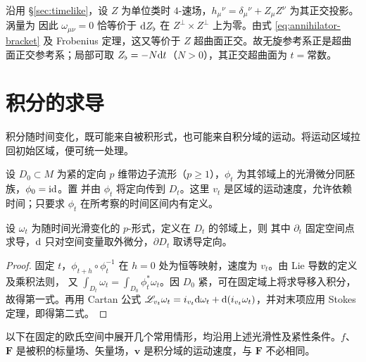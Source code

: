 \begin{example}[无旋参考系]
    沿用 \S\ref{sec:timelike}，设 $Z$ 为单位类时 $4$-速场，$h_\mu{}^\nu=\delta_\mu{}^\nu+Z_\mu Z^\nu$ 为其正交投影。涡量为
    因此 $\omega_{\mu\nu}=0$ 恰等价于 $\dd Z_\flat$ 在 $Z^\perp\times Z^\perp$ 上为零。由式 \eqref{eq:annihilator-bracket} 及 Frobenius 定理，这又等价于 $Z$ 超曲面正交。故无旋参考系正是超曲面正交参考系；局部可取 $Z_\flat=-N\dd t$（$N>0$），其正交超曲面为 $t=\text{常数}$。
\end{example}

\section{积分的求导}

积分随时间变化，既可能来自被积形式，也可能来自积分域的运动。将运动区域拉回初始区域，便可统一处理。

设 $D_0\subset M$ 为紧的定向 $p$ 维带边子流形（$p\geqslant1$），$\phi_t$ 为其邻域上的光滑微分同胚族，$\phi_0=\mathrm{id}$。置
并由 $\phi_t$ 将定向传到 $D_t$。这里 $v_t$ 是区域的运动速度，允许依赖时间；只要求 $\phi_t$ 在所考察的时间区间内有定义。

\begin{theorem}[广义 Leibniz 公式]
    设 $\omega_t$ 为随时间光滑变化的 $p$-形式，定义在 $D_t$ 的邻域上，则
    其中 $\partial_t$ 固定空间点求导，$\dd$ 只对空间变量取外微分，$\partial D_t$ 取诱导定向。
\end{theorem}
\begin{proof}
    固定 $t$，$\phi_{t+h}\circ\phi_t^{-1}$ 在 $h=0$ 处为恒等映射，速度为 $v_t$。由 Lie 导数的定义及乘积法则，
    又 $\int_{D_t}\omega_t=\int_{D_0}\phi_t^*\omega_t$。因 $D_0$ 紧，可在固定域上将求导移入积分，故得第一式。再用 Cartan 公式
    $\mathscr{L}_{v_t}\omega_t=i_{v_t}\dd\omega_t+\dd(i_{v_t}\omega_t)$，并对末项应用 Stokes 定理，即得第二式。
\end{proof}

以下在固定的欧氏空间中展开几个常用情形，均沿用上述光滑性及紧性条件。$f$、$\bm F$ 是被积的标量场、矢量场，$\bm v$ 是积分域的运动速度，与 $\bm F$ 不必相同。

